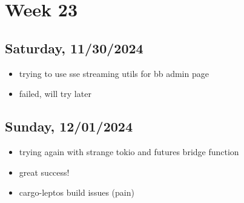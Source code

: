 \newpage
\section{Week 23}

\subsection{Saturday, 11/30/2024}
\begin{itemize}
    \item trying to use sse streaming utils for bb admin page
    \item failed, will try later
\end{itemize}

\subsection{Sunday, 12/01/2024}
\begin{itemize}
    \item trying again with strange tokio and futures bridge function
    \item great success!
    \item cargo-leptos build issues (pain)
\end{itemize}
